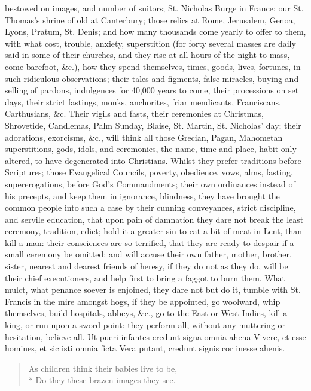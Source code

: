 {bestowed on images, and number of suitors; St. Nicholas Burge in
France; our St. Thomas's shrine of old at Canterbury; those relics at
Rome, Jerusalem, Genoa, Lyons, Pratum, St. Denis; and how many
thousands come yearly to offer to them, with what cost, trouble,
anxiety, superstition (for forty several masses are daily said in some
of their churches, and they rise at all hours of the night to
mass, come barefoot, \&c.), how they spend themselves, times, goods,
lives, fortunes, in such ridiculous observations; their tales and
figments, false miracles, buying and selling of pardons, indulgences
for 40,000 years to come, their processions on set days, their strict
fastings, monks, anchorites, friar mendicants, Franciscans,
Carthusians, \&c. Their vigils and fasts, their ceremonies at Christmas,
Shrovetide, Candlemas, Palm Sunday, Blaise, St. Martin, St. Nicholas'
day; their adorations, exorcisms, \&c., will think all those Grecian,
Pagan, Mahometan superstitions, gods, idols, and ceremonies, the name,
time and place, habit only altered, to have degenerated into
Christians. Whilst they prefer traditions before Scriptures; those
Evangelical Councils, poverty, obedience, vows, alms, fasting,
supererogations, before God's Commandments; their own ordinances
instead of his precepts, and keep them in ignorance, blindness, they
have brought the common people into such a case by their cunning
conveyances, strict discipline, and servile education, that upon pain
of damnation they dare not break the least ceremony, tradition, edict;
hold it a greater sin to eat a bit of meat in Lent, than kill a man:
their consciences are so terrified, that they are ready to despair if a
small ceremony be omitted; and will accuse their own father, mother,
brother, sister, nearest and dearest friends of heresy, if they do not
as they do, will be their chief executioners, and help first to bring a
faggot to burn them. What mulct, what penance soever is enjoined, they
dare not but do it, tumble with St. Francis in the mire amongst hogs,
if they be appointed, go woolward, whip themselves, build hospitals,
abbeys, \&c., go to the East or West Indies, kill a king, or run upon a
sword point: they perform all, without any muttering or hesitation,
believe all.
Ut pueri infantes credunt signa omnia ahena
Vivere, et esse homines, et sic isti omnia ficta
Vera putant, credunt signis cor inesse ahenis.

\begin{verse}
As children think their babies live to be,\\*
Do they these brazen images they see.
\end{verse}

}
